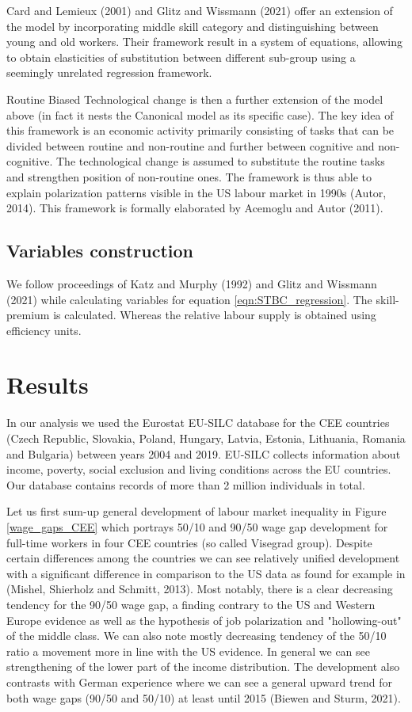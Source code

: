 \documentclass{article}
\begin{document}
Card and Lemieux (2001) and Glitz and Wissmann (2021) offer an extension of the model by incorporating middle skill category and distinguishing between young and old workers. Their framework result in a system of equations, allowing to obtain elasticities of substitution between different sub-group using a seemingly unrelated regression framework.

Routine Biased Technological change is then a further extension of the model above (in fact it nests the Canonical model as its specific case). The key idea of this framework is an economic activity primarily consisting of tasks that can be divided between routine and non-routine and further between cognitive and non-cognitive. The technological change is assumed to substitute the routine tasks and strengthen position of non-routine ones. The framework is thus able to explain polarization patterns visible in the US labour market in 1990s (Autor, 2014). This framework is formally elaborated by Acemoglu and Autor (2011).

\subsection{Variables construction}
We follow proceedings of Katz and Murphy (1992) and Glitz and Wissmann (2021) while calculating variables for equation \ref{eqn:STBC_regression}. The skill-premium is calculated. Whereas the relative labour supply is obtained using efficiency units.


\section{Results}
In our analysis we used the Eurostat EU-SILC database for the CEE countries (Czech Republic, Slovakia, Poland, Hungary, Latvia, Estonia, Lithuania, Romania and Bulgaria) between years 2004 and 2019. EU-SILC collects information about income, poverty, social exclusion and living conditions across the EU countries. Our database contains records of more than 2 million individuals in total.

Let us first sum-up general development of labour market inequality in Figure \ref{wage_gaps_CEE} which portrays 50/10 and 90/50 wage gap development for full-time workers in four CEE countries (so called Visegrad group). Despite certain differences among the countries we can see relatively unified development with a significant difference in comparison to the US data as found for example in (Mishel, Shierholz and Schmitt, 2013). Most notably, there is a clear decreasing tendency for the 90/50 wage gap, a finding contrary to the US and Western Europe evidence as well as the hypothesis of job polarization and "hollowing-out" of the middle class. We can also note mostly decreasing tendency of the 50/10 ratio a movement more in line with the US evidence. In general we can see strengthening of the lower part of the income distribution. The development also contrasts with German experience where we can see a general upward trend for both wage gaps (90/50 and 50/10) at least until 2015 (Biewen and Sturm, 2021).
\end{document}
